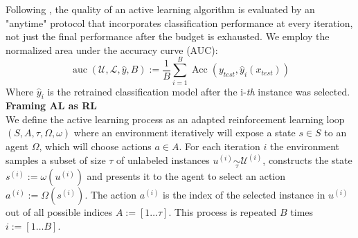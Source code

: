 \documentclass[]{article}
\begin{document}
Following \cite{zhou2021towards}, the quality of an active learning algorithm is evaluated by an "anytime" protocol that incorporates classification performance at every iteration, not just the final performance after the budget is exhausted.
We employ the normalized area under the accuracy curve (AUC):
\begin{equation}\label{eq:auc}
	\operatorname{auc}(\mathcal{U}, \mathcal{L}, \hat y, B) := \frac{1}{B} \sum_{i=1}^{B} \operatorname{Acc}(y_{test}, \hat y_i(x_{test}))
\end{equation}
Where $\hat y_i$ is the retrained classification model after the i-\textit{th} instance was selected. \\ [1mm]
%
\textbf{Framing AL as RL}\\
We define the active learning process as an adapted reinforcement learning loop $(S, A, \tau, \Omega, \omega)$ where an environment iteratively will expose a state $s \in S$ to an agent $\Omega$, which will choose actions $a \in A$.
For each iteration $i$ the environment samples a subset of size $\tau$ of unlabeled instances $u^{(i)} \underset{\tau}{\sim} \mathcal{U}^{(i)}$, constructs the state $s^{(i)} := \omega(u^{(i)})$ and presents it to the agent to select an action $a^{(i)} := \Omega(s^{(i)})$.
The action $a^{(i)}$ is the index of the selected instance in $u^{(i)}$ out of all possible indices $A := [1 \ldots \tau]$.
This process is repeated $B$ times $i := [1 \ldots B]$.
\end{document}
